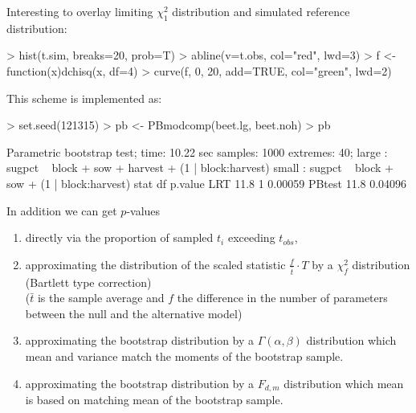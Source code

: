 \begin{sframe}

  Interesting to overlay limiting $\chi^2_1$
  distribution and simulated reference distribution:
  
\begin{Schunk}
\begin{Sinput}
> hist(t.sim, breaks=20, prob=T)
> abline(v=t.obs, col="red", lwd=3)
> f <- function(x){dchisq(x, df=4)}
> curve(f, 0, 20, add=TRUE, col="green", lwd=2)
\end{Sinput}
\end{Schunk}
  
\end{sframe}








\begin{sframe}

  This scheme is implemented as:

\begin{sblock}
\begin{Schunk}
\begin{Sinput}
> set.seed(121315)
> pb <- PBmodcomp(beet.lg, beet.noh)
> pb
\end{Sinput}
\begin{Soutput}
Parametric bootstrap test; time: 10.22 sec
samples: 1000 extremes: 40;
large : sugpct ~ block + sow + harvest + (1 | block:harvest)
small : sugpct ~ block + sow + (1 | block:harvest)
       stat df p.value
LRT    11.8  1 0.00059
PBtest 11.8    0.04096
\end{Soutput}
\end{Schunk}
\end{sblock}  
\end{sframe}

\begin{sframe}

In addition we can get $p$-values
  
  \begin{enumerate}
\item
directly via the proportion of sampled $t_i$ exceeding $t_{obs}$, 
\item
  approximating the distribution of the scaled statistic $\frac{f}{\bar t}\cdot T$ by
  a  $\chi^2_f$ distribution (Bartlett type correction)\\
  ($\bar t$ is the sample average  and $f$ the difference in the number of parameters
  between the null and the alternative model)  
\item
  approximating the bootstrap distribution by a $\Gamma(\alpha,\beta)$ distribution
  which mean and variance match the moments of the bootstrap sample.
\item 
  approximating the bootstrap distribution by a $F_{d,m}$ distribution
  which mean is based on matching mean of  the bootstrap sample.
\end{enumerate}

\end{sframe}


